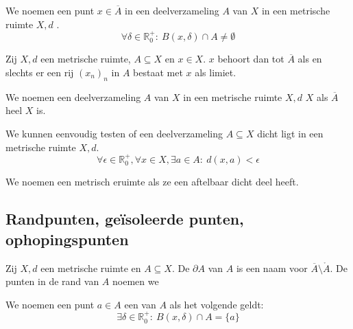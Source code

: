 \documentclass[main.tex]{subfiles}
\begin{document}
\begin{de}
  We noemen een punt $x\in \overline{A}$ in een deelverzameling $A$ van $X$ in een metrische ruimte $X,d$ .
  \[ \forall \delta \in \mathbb{R}_{0}^{+}:\ B(x,\delta) \cap A \neq \emptyset \]
\end{de}

\begin{pr}
  \label{pr:metrische-ruimte-sluiting-itv-limiet}
  Zij $X,d$ een metrische ruimte, $A \subseteq X$ en $x\in X$.
  $x$ behoort dan tot $\overline{A}$ als en slechts er een rij $(x_{n})_{n}$ in $A$ bestaat met $x$ als limiet.
\end{pr}

\begin{de}
  We noemen een deelverzameling $A$ van $X$ in een metrische ruimte $X,d$  $X$ als $\overline{A}$ heel $X$ is.
\end{de}

\begin{st}
  \label{st:metrische-ruimte-dicht-in-test}
  We kunnen eenvoudig testen of een deelverzameling $A\subseteq X$ dicht ligt in een metrische ruimte $X,d$.
  \[ \forall \epsilon \in \mathbb{R}_{0}^{+}, \forall x\in X, \exists a\in A:\ d(x,a) < \epsilon \]
\end{st}

\begin{de}
  We noemen een metrisch eruimte  als ze een aftelbaar dicht deel heeft.
\end{de}

\subsection{Randpunten, ge\"isoleerde punten, ophopingspunten}
\label{sec:randp-geis-punt}

\begin{de}
  Zij $X,d$ een metrische ruimte en $A \subseteq X$.
  De  $\partial A$ van $A$ is een naam voor $\overline{A} \setminus \mathring{A}$.
  De punten in de rand van $A$ noemen we 
\end{de}

\begin{de}
  We noemen een punt $a\in A$ een  van $A$ als het volgende geldt:
  \[ \exists \delta \in \mathbb{R}_{0}^{+}:\ B(x,\delta) \cap A = \{a\} \]
\end{de}
\end{document}
